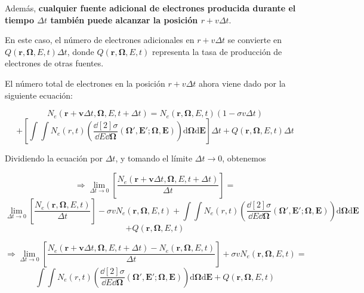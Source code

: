 \documentclass[aspectratio=169,xcolor=dvipsnames,t]{beamer}
\newcommand{\be}{\begin{equation*}}
\newcommand{\ee}{\end{equation*}}
\newcommand{\pl}{\left(}
\newcommand{\pr}{\right)}
\newcommand{\kl}{\left[}
\newcommand{\kr}{\right]}
\begin{document}
\begin{frame}

    Además, \textbf{cualquier fuente adicional de electrones producida durante el tiempo $\Delta t$ también puede alcanzar la posición $r + v \Delta t$}. 
    
    En este caso, el número de electrones adicionales en $r + v \Delta t$ se convierte en $Q(\mathbf{r},\bm{\Omega},E,t) \Delta t$, donde $Q(\mathbf{r},\bm{\Omega},E,t)$ representa la tasa de producción de electrones de otras fuentes.

    El número total de electrones en la posición $r + v\Delta t$ ahora viene dado por la siguiente ecuación:

    \be
    N_e(\mathbf{r} + \mathbf{v} \Delta t, \bm{\Omega}, E, t + \Delta t) = N_e(\mathbf{r},\bm{\Omega}, E, t) (1- \sigma v \Delta t) 
    \ee
    \be
    + \kl \int \int N_e(r,t) \pl \frac{\dd[2]{\sigma}}{\dd E \dd \bm{\Omega}} (\bm{\Omega}',\mathbf{E}';\bm{\Omega},\mathbf{E}) \pr \text{d}\bm{\Omega} \text{d}\mathbf{E} \kr \Delta t + Q(\mathbf{r},\bm{\Omega},E,t) \Delta t
    \ee

\end{frame}

\begin{frame}

    Dividiendo la ecuación por $\Delta t$, y tomando el límite $\Delta t  \rightarrow 0 $, obtenemos

    \vspace{-0.3cm}

    \be
    \Rightarrow  \lim_{\Delta t  \rightarrow 0} \kl \frac{N_e(\mathbf{r} + \mathbf{v} \Delta t, \bm{\Omega}, E, t + \Delta t)}{\Delta t} \kr = 
    \ee
    \be
    \lim_{\Delta t  \rightarrow 0} \kl \frac{N_e(\mathbf{r},\bm{\Omega}, E, t)}{\Delta t} \kr  - \sigma v N_e(\mathbf{r},\bm{\Omega}, E, t) + \int \int N_e(r,t) \pl \frac{\dd[2]{\sigma}}{\dd E \dd \bm{\Omega}} (\bm{\Omega}',\mathbf{E}';\bm{\Omega},\mathbf{E}) \pr \text{d}\bm{\Omega} \text{d}\mathbf{E} 
    \ee
    \be
    + Q(\mathbf{r},\bm{\Omega},E,t)
    \ee

    \be
    \Rightarrow  \lim_{\Delta t  \rightarrow 0} \kl \frac{N_e(\mathbf{r} + \mathbf{v} \Delta t, \bm{\Omega}, E, t + \Delta t) - N_e(\mathbf{r},\bm{\Omega}, E, t)}{\Delta t} \kr + \sigma v N_e(\mathbf{r},\bm{\Omega}, E, t) = 
    \ee
    \be
    \int \int N_e(r,t) \pl \frac{\dd[2]{\sigma}}{\dd E \dd \bm{\Omega}} (\bm{\Omega}',\mathbf{E}';\bm{\Omega},\mathbf{E}) \pr \text{d}\bm{\Omega} \text{d}\mathbf{E} + Q(\mathbf{r},\bm{\Omega},E,t)
    \ee    

\end{frame}
\end{document}
